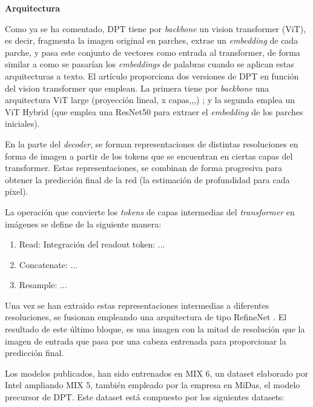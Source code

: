 \documentclass[a4paper]{article}
\begin{document}

\textbf{Arquitectura}

Como ya se ha comentado, DPT tiene por \textit{backbone} un vision transformer (ViT), es decir, fragmenta la imagen original en parches, extrae un \textit{embedding} de cada parche, y pasa este conjunto de vectores como entrada al transformer, de forma similar a como se pasarían los \textit{embeddings} de palabras cuando se aplican estas arquitecturas a texto. El artículo proporciona dos versiones de DPT en función del vision transformer que emplean. La primera tiene por \textit{backbone} una arquitectura ViT large (proyección lineal, x capas,,,) ; y la segunda emplea un ViT Hybrid (que emplea una ResNet50 para extraer el \textit{embedding} de los parches iniciales).

En la parte del \textit{decoder}, se forman representaciones de distintas resoluciones en forma de imagen a partir de los tokens que se encuentran en ciertas capas del transformer. Estas representaciones, se combinan de forma progresiva para obtener la predicción final de la red (la estimación de profundidad para cada píxel).

La operación que convierte los \textit{tokens} de capas intermedias del \textit{transformer} en imágenes se define de la siguiente manera:


\begin{enumerate}
\item{Read: Integración del readout token: ...}
\item{Concatenate: ...}
\item{Resample: ...}
\end{enumerate}

Una vez se han extraido estas representaciones intermedias a diferentes resoluciones, se fusionan empleando una arquitectura de tipo RefineNet . El resultado de este último bloque, es una imagen con la mitad de resolución que la imagen de entrada que pasa por una cabeza entrenada para proporcionar la predicción final. 

Los modelos publicados, han sido entrenados en MIX 6, un dataset elaborado por Intel ampliando MIX 5, también empleado por la empresa en MiDas, el modelo precursor de DPT. Este dataset está compuesto por los siguientes datasets:
\end{document}
